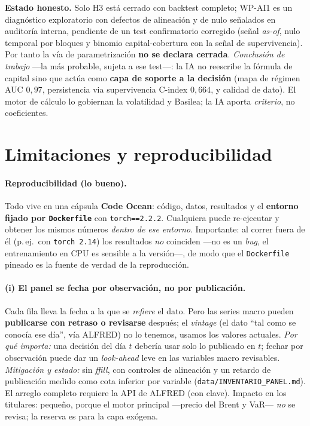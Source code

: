 \documentclass[11pt,a4paper]{article}
\begin{document}
\noindent \textbf{Estado honesto.} Solo H3 está cerrado con backtest completo;
WP-AI1 es un diagnóstico exploratorio con defectos de alineación y de nulo
señalados en auditoría interna, pendiente de un test confirmatorio corregido
(señal \emph{as-of}, nulo temporal por bloques y binomio capital-cobertura con la
señal de supervivencia). Por tanto la vía de parametrización \textbf{no se declara
cerrada}. \emph{Conclusión de trabajo} ---la más probable, sujeta a ese test---:
la IA no reescribe la fórmula de capital sino que actúa como \textbf{capa de
soporte a la decisión} (mapa de régimen AUC $0{,}97$, persistencia via
supervivencia C-index $0{,}664$, y calidad de dato). El motor de cálculo lo
gobiernan la volatilidad y Basilea; la IA aporta \emph{criterio}, no coeficientes.

\section{Limitaciones y reproducibilidad}\label{sec:limites}
\paragraph{Reproducibilidad (lo bueno).} Todo vive en una cápsula \textbf{Code
Ocean}: código, datos, resultados y el \textbf{entorno fijado por
\texttt{Dockerfile}} con \texttt{torch==2.2.2}. Cualquiera puede re-ejecutar y
obtener los mismos números \emph{dentro de ese entorno}. Importante: al correr
fuera de él (p.\,ej.\ con \texttt{torch 2.14}) los resultados \emph{no} coinciden
---no es un \emph{bug}, el entrenamiento en CPU es sensible a la versión---, de
modo que el \texttt{Dockerfile} pineado es la fuente de verdad de la reproducción.

\paragraph{(i) El panel se fecha por observación, no por publicación.} Cada fila
lleva la fecha a la que se \emph{refiere} el dato. Pero las series macro pueden
\textbf{publicarse con retraso o revisarse} después; el \emph{vintage} (el dato
``tal como se conocía ese día'', vía ALFRED) no lo tenemos, usamos los valores
actuales.
\textit{Por qué importa:} una decisión del día $t$ debería usar solo lo publicado
en $t$; fechar por observación puede dar un \emph{look-ahead} leve en las
variables macro revisables.
\textit{Mitigación y estado:} sin \emph{ffill}, con controles de alineación y un
retardo de publicación medido como cota inferior por variable
(\texttt{data/INVENTARIO\_PANEL.md}). El arreglo completo requiere la API de
ALFRED (con clave). Impacto en los titulares: pequeño, porque el motor principal
---precio del Brent y VaR--- \emph{no} se revisa; la reserva es para la capa
exógena.
\end{document}
